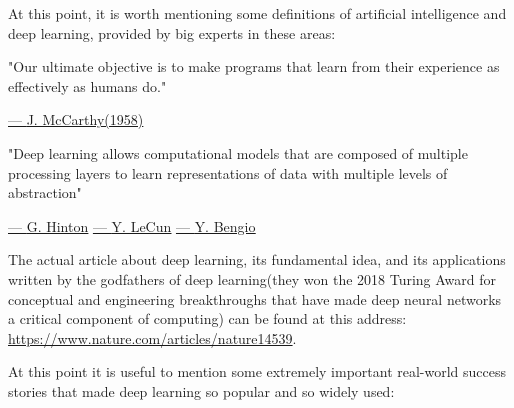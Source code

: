 \vspace{5mm}

At this point, it is worth mentioning some definitions of artificial
intelligence and deep learning, provided by big experts in these areas:

\vspace{5mm}

\begin{quoting}
    "Our ultimate objective is to make programs that learn from their
    experience as effectively as humans do."
\end{quoting}

\hspace{306pt}
\href{https://en.wikipedia.org/wiki/John_McCarthy_(computer_scientist)}{--- \underline{J. McCarthy(1958)}}

\vspace{5mm}

\begin{quoting}
    "Deep learning allows computational models that are composed of
    multiple processing layers to learn representations of data with
    multiple levels of abstraction"
\end{quoting}

\hspace{210pt}
\href{https://en.wikipedia.org/wiki/Geoffrey_Hinton}{--- \underline{G. Hinton}}
\href{https://en.wikipedia.org/wiki/Yann_LeCun}{--- \underline{Y. LeCun}}
\href{https://en.wikipedia.org/wiki/Yoshua_Bengio}{--- \underline{Y. Bengio}}

\newpage

The actual article about deep learning, its fundamental idea, and its
applications written by the godfathers of deep learning(they won
the 2018 Turing Award for conceptual and engineering breakthroughs that
have made deep neural networks a critical component of computing) can be
found at this address:
\url{https://www.nature.com/articles/nature14539}.

At this point it is useful to mention some extremely important real-world
success stories that made deep learning so popular and so widely used:

